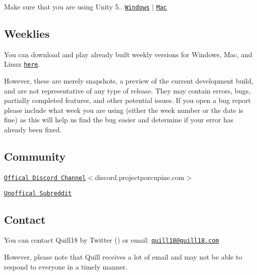 Make sure that you are using Unity 5.. \href{https://store.unity.com/download/thank-you?thank-you=personal&os=win&nid=325}{\tt Windows} $\vert$ \href{https://store.unity.com/download/thank-you?thank-you=personal&os=osx&nid=325}{\tt Mac}

\subsection*{Weeklies}

You can download and play already built \textquotesingle{}weekly\textquotesingle{} versions for Windows, Mac, and Linux \href{https://bintray.com/orderoftheporcupine/ProjectPorcupine/Prebuilt-Binaries}{\tt here}.

However, these are merely \textquotesingle{}snapshots\textquotesingle{}, a preview of the current development build, and are not representative of any type of release. They may contain errors, bugs, partially completed features, and other potential issues. If you open a bug report please include what week you are using (either the week number or the date is fine) as this will help us find the bug easier and determine if your error has already been fixed.

\subsection*{Community}


\begin{DoxyItemize}
\item \href{https://discord.gg/68hkpSA}{\tt Offical Discord Channel}$<$discord.\+projectporcupine.\+com$>$
\item \href{https://reddit.com/r/ProjectPorcupine}{\tt Unoffical Subreddit}
\end{DoxyItemize}

\subsection*{Contact}

You can contact Quill18 by Twitter () or email\+: \href{mailto:quill18@quill18.com}{\tt quill18@quill18.\+com}

However, please note that Quill receives a lot of email and may not be able to respond to everyone in a timely manner. 